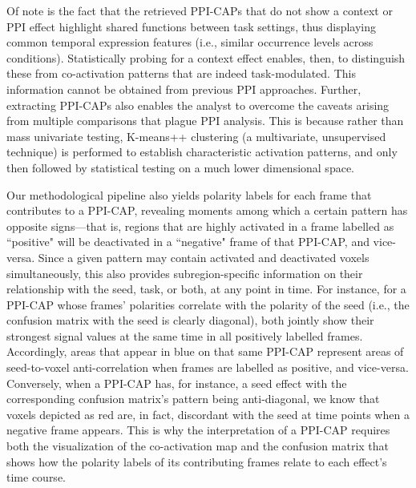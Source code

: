 Of note is the fact that the retrieved PPI-CAPs that do not show a context or PPI effect highlight shared functions between task settings, thus displaying common temporal expression features (i.e., similar occurrence levels across conditions). Statistically probing for a context effect enables, then, to distinguish these from co-activation patterns that are indeed task-modulated. This information cannot be obtained from previous PPI approaches. Further, extracting PPI-CAPs also enables the analyst to overcome the caveats arising from multiple comparisons that plague PPI analysis. This is because rather than mass univariate testing, K-means++ clustering (a multivariate, unsupervised technique) is performed to establish characteristic activation patterns, and only then followed by statistical testing on a much lower dimensional space.


Our methodological pipeline also yields polarity labels for each frame that contributes to a PPI-CAP, revealing moments among which a certain pattern has opposite signs---that is, regions that are highly activated in a frame labelled as ``positive" will be deactivated in a ``negative" frame of that PPI-CAP, and vice-versa. Since a given pattern may contain activated and deactivated voxels simultaneously, this also provides subregion-specific information on their relationship with the seed, task, or both, at any point in time. For instance, for a PPI-CAP whose frames' polarities correlate with the polarity of the seed (i.e., the confusion matrix with the seed is clearly diagonal), both jointly show their strongest signal values at the same time in all positively labelled frames. Accordingly, areas that appear in blue on that same PPI-CAP represent areas of seed-to-voxel anti-correlation when frames are labelled as positive, and vice-versa. Conversely, when a PPI-CAP has, for instance, a seed effect with the corresponding confusion matrix's pattern being anti-diagonal, we know that voxels depicted as red are, in fact, discordant with the seed at time points when a negative frame appears. This is why the interpretation of a PPI-CAP requires both the visualization of the co-activation map and the confusion matrix that shows how the polarity labels of its contributing frames relate to each effect's time course.  

